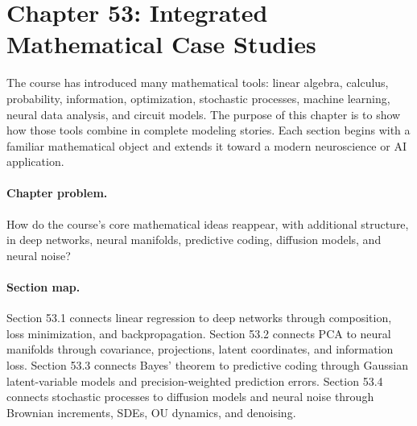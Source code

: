 \section{Chapter 53: Integrated Mathematical Case Studies}
\label{ch:integrated-mathematical-case-studies}

The course has introduced many mathematical tools: linear algebra, calculus, probability, information, optimization, stochastic processes, machine learning, neural data analysis, and circuit models. The purpose of this chapter is to show how those tools combine in complete modeling stories. Each section begins with a familiar mathematical object and extends it toward a modern neuroscience or AI application.

\paragraph{Chapter problem.}
How do the course's core mathematical ideas reappear, with additional structure, in deep networks, neural manifolds, predictive coding, diffusion models, and neural noise?

\paragraph{Section map.}
Section 53.1 connects linear regression to deep networks through composition, loss minimization, and backpropagation. Section 53.2 connects PCA to neural manifolds through covariance, projections, latent coordinates, and information loss. Section 53.3 connects Bayes' theorem to predictive coding through Gaussian latent-variable models and precision-weighted prediction errors. Section 53.4 connects stochastic processes to diffusion models and neural noise through Brownian increments, SDEs, OU dynamics, and denoising.

